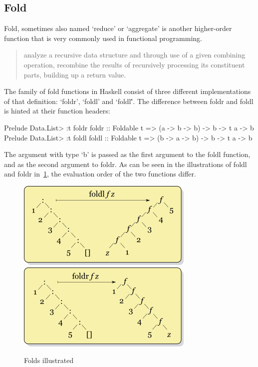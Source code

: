 \subsection{Fold}\label{sec:fold}

Fold, sometimes also named `reduce' or `aggregate' is another higher-order function
that is very commonly used in functional programming.

\begin{quote}
    analyze a recursive data structure and through use of a given
    combining operation, recombine the results of recursively processing its
    constituent parts, building up a return value.\autocite{fold-wiki}
\end{quote}

The family of fold functions in Haskell consist of three different implementations of
that definition: `foldr', `foldl' and `foldl\''.
The difference between foldr and foldl is hinted at their function headers:
\begin{code}
    \begin{haskellcode}
Prelude Data.List> :t foldr
foldr :: Foldable t => (a -> b -> b) -> b -> t a -> b
Prelude Data.List> :t foldl
foldl :: Foldable t => (b -> a -> b) -> b -> t a -> b
    \end{haskellcode}
\end{code}
The argument with type `b' is passed as the first argument to the foldl
function, and as the second argument to foldr. As can be seen in the illustrations
of foldl and foldr in~\ref{fig:fold}, the evaluation order of the two functions
differ.

\begin{figure}[h!]
    \centering
    \includegraphics[scale=0.5]{../img/foldl.png}
    \includegraphics[scale=0.5]{../img/foldr.png}
    \caption{Folds illustrated\autocite{fold-wiki}}
    \label{fig:fold}
\end{figure}

